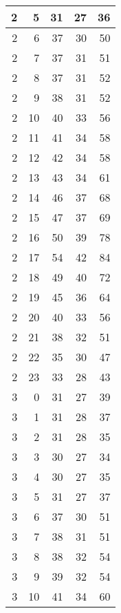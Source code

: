 \begin{longtable}{|r|r|r|r|r|}
    2     & 5     & 31    & 27    & 36 \\\hline
    2     & 6     & 37    & 30    & 50 \\\hline
    2     & 7     & 37    & 31    & 51 \\\hline
    2     & 8     & 37    & 31    & 52 \\\hline
    2     & 9     & 38    & 31    & 52 \\\hline
    2     & 10    & 40    & 33    & 56 \\\hline
    2     & 11    & 41    & 34    & 58 \\\hline
    2     & 12    & 42    & 34    & 58 \\\hline
    2     & 13    & 43    & 34    & 61 \\\hline
    2     & 14    & 46    & 37    & 68 \\\hline
    2     & 15    & 47    & 37    & 69 \\\hline
    2     & 16    & 50    & 39    & 78 \\\hline
    2     & 17    & 54    & 42    & 84 \\\hline
    2     & 18    & 49    & 40    & 72 \\\hline
    2     & 19    & 45    & 36    & 64 \\\hline
    2     & 20    & 40    & 33    & 56 \\\hline
    2     & 21    & 38    & 32    & 51 \\\hline
    2     & 22    & 35    & 30    & 47 \\\hline
    2     & 23    & 33    & 28    & 43 \\\hline
    3     & 0     & 31    & 27    & 39 \\\hline
    3     & 1     & 31    & 28    & 37 \\\hline
    3     & 2     & 31    & 28    & 35 \\\hline
    3     & 3     & 30    & 27    & 34 \\\hline
    3     & 4     & 30    & 27    & 35 \\\hline
    3     & 5     & 31    & 27    & 37 \\\hline
    3     & 6     & 37    & 30    & 51 \\\hline
    3     & 7     & 38    & 31    & 51 \\\hline
    3     & 8     & 38    & 32    & 54 \\\hline
    3     & 9     & 39    & 32    & 54 \\\hline
    3     & 10    & 41    & 34    & 60 \\\hline

\end{longtable}
